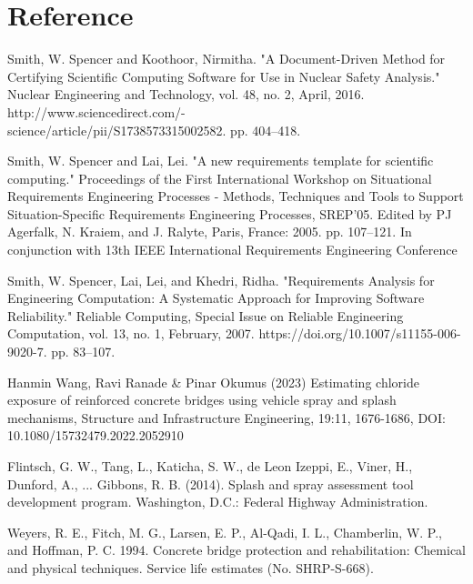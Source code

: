 \documentclass[12pt]{article}
\newcounter{refnum} %
\begin{document}
\newpage
\section*{Reference}
\begin{enumerate}[label={[\arabic*]}]
\item {} \label{ref1}
Smith, W. Spencer and Koothoor, Nirmitha. "A Document-Driven Method for Certifying Scientific Computing Software for Use in Nuclear Safety Analysis." Nuclear Engineering and Technology, vol. 48, no. 2, April, 2016. http://www.sciencedirect.com/-\\science/article/pii/S1738573315002582. pp. 404–418.

\item {} \label{ref2}
Smith, W. Spencer and Lai, Lei. "A new requirements template for scientific computing." Proceedings of the First International Workshop on Situational Requirements Engineering Processes - Methods, Techniques and Tools to Support Situation-Specific Requirements Engineering Processes, SREP'05. Edited by PJ Agerfalk, N. Kraiem, and J. Ralyte, Paris, France: 2005. pp. 107–121. In conjunction with 13th IEEE International Requirements Engineering Conference

\item {} \label{ref3}
Smith, W. Spencer, Lai, Lei, and Khedri, Ridha. "Requirements Analysis for Engineering Computation: A Systematic Approach for Improving Software Reliability." Reliable Computing, Special Issue on Reliable Engineering Computation, vol. 13, no. 1, February, 2007. https://doi.org/10.1007/s11155-006-9020-7. pp. 83–107.

\item {} \label{ref4}
Hanmin Wang, Ravi Ranade \& Pinar Okumus (2023) Estimating chloride exposure of reinforced concrete bridges using vehicle spray and splash mechanisms, Structure and Infrastructure Engineering, 19:11, 1676-1686, DOI: 10.1080/15732479.2022.2052910

\item {} \label{ref5}
Flintsch, G. W., Tang, L., Katicha, S. W., de Leon Izeppi, E., Viner, H., Dunford, A., ... Gibbons, R. B. (2014). Splash and spray assessment tool development program. Washington, D.C.: Federal Highway Administration.

\item {} \label{ref6}
Weyers, R. E., Fitch, M. G., Larsen, E. P., Al-Qadi, I. L., Chamberlin, W. P., and Hoffman, P.  C. 1994. Concrete bridge protection and rehabilitation: Chemical and physical techniques. Service life estimates (No. SHRP-S-668).


\end{enumerate}
\end{document}
